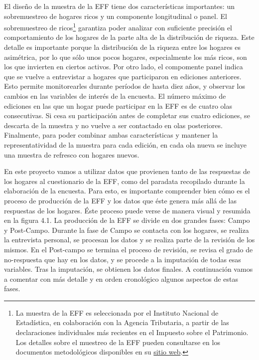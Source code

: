 El diseño de la muestra de la EFF tiene dos características importantes: un sobremuestreo de hogares ricos y un componente longitudinal o panel. El sobremuestreo de ricos\footnote{La muestra de la EFF es seleccionada por el Instituto Nacional de Estadística, en colaboración con la Agencia Tributaria, a partir de las declaraciones individuales más recientes en el Impuesto sobre el Patrimonio. Los detalles sobre el muestreo de la EFF pueden consultarse en los documentos metodológicos disponibles en su \href{https://app.bde.es/efs_www/home?lang=ES}{sitio web}.} garantiza poder analizar con suficiente precisión el comportamiento de los hogares de la parte alta de la distribución de riqueza. Este detalle es importante porque la distribución de la riqueza entre los hogares es asimétrica, por lo que sólo unos pocos hogares, especialmente los más ricos, son los que invierten en ciertos activos. Por otro lado, el compomente panel indica que se vuelve a entrevistar a hogares que participaron en ediciones anteriores. Esto permite monitorearles durante períodos de hasta diez años, y observar los cambios en las variables de interés de la encuesta. El número máximo de ediciones en las que un hogar puede participar en la EFF es de cuatro olas consecutivas. Si cesa su participación antes de completar sus cuatro ediciones, se descarta de la muestra y no vuelve a ser contactado en olas posteriores. Finalmente, para poder combinar ambas características y mantener la representatividad de la muestra para cada edición, en cada ola nueva se incluye una muestra de refresco con hogares nuevos.

En este proyecto vamos a utilizar datos que provienen tanto de las respuestas de los hogares al cuestionario de la EFF, como del paradata recopilado durante la elaboración de la encuesta. Para esto, es importante comprender bien cómo es el proceso de producción de la EFF y los datos que éste genera más allá de las respuestas de los hogares. Éste proceso puede verse de manera visual y resumida en la figura 4.1. La producción de la EFF se divide en dos grandes fases: Campo y Post-Campo. Durante la fase de Campo se contacta con los hogares, se realiza la entrevista personal, se procesan los datos y se realiza parte de la revisión de los mismos. En el Post-campo se termina el proceso de revisión, se revisa el grado de no-respuesta que hay en los datos, y se procede a la imputación de todas esas variables. Tras la imputación, se obtienen los datos finales. A continuación vamos a comentar con más detalle y en orden cronológico algunos aspectos de estas fases.


